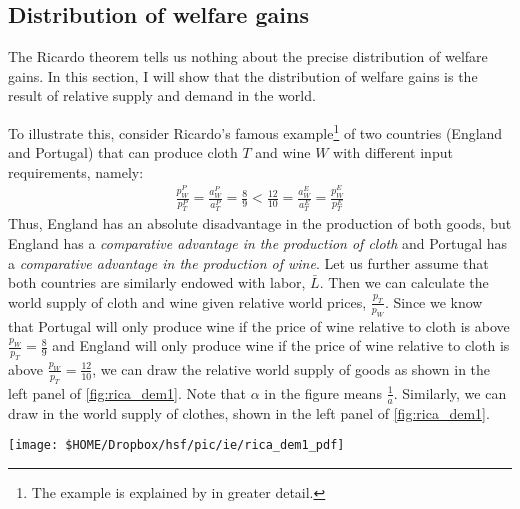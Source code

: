 {%
%
	
	\pbn
	\subsection{Distribution of welfare gains}
	The Ricardo theorem tells us nothing about the precise distribution of welfare gains. In this section, I will show that the distribution of welfare gains is the result of relative supply and demand in the world.
	
	To illustrate this, consider Ricardo's famous example\footnote{The example is explained by \citet{Academy2012International} in greater detail.} of two countries (England and Portugal) that can produce cloth $T$ and wine $W$ with different input requirements, namely:
	\begin{align*}
		\frac{p^P_W}{p^P_T}=\frac{a^P_W}{a^P_T}=\frac{8}{9}<\frac{12}{10}=\frac{a^E_W}{a^E_T}= \frac{p^E_W}{p^E_T}
	\end{align*}
	Thus, England has an absolute disadvantage in the production of both goods, but England has a \textit{comparative advantage in the production of cloth} and Portugal has a \textit{comparative advantage in the production of wine}. Let us further assume that both countries are similarly endowed with labor, $\bar{L}$. Then we can calculate the world supply of cloth and wine given relative world prices, $\frac{p_T}{p_W}$. Since we know that Portugal will only produce wine if the price of wine relative to cloth is above $\frac{p_W}{p_T}=\frac{8}{9}$ and England will only produce wine if the price of wine relative to cloth is above $\frac{p_W}{p_T}=\frac{12}{10}$, we can draw the relative world supply of goods as shown in the left panel of \autoref{fig:rica_dem1}. Note that $\alpha$ in the figure means $\frac{1}{a}$. Similarly, we can draw in the world supply of clothes, shown in the left panel of \autoref{fig:rica_dem1}.
	
	
	\begin{center}
		\texttt{[image: \$HOME/Dropbox/hsf/pic/ie/rica\_dem1\_pdf]}
		\label{fig:rica_dem1}\bigskip
	\end{center}
	
}
